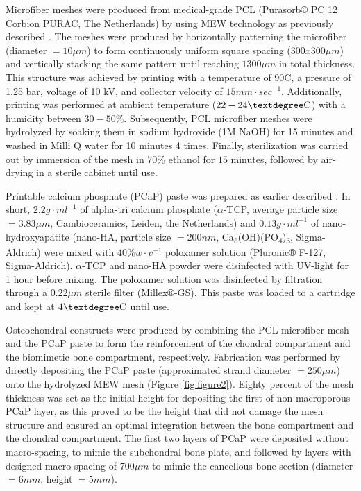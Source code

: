 \documentclass[twocolumn, empirical, authordate, issue]{jote-new-article}
\begin{document}
Microfiber meshes were produced from medical-grade PCL (Purasorb® PC 12 Corbion PURAC, The Netherlands) by using MEW technology as previously described \parencite{deRuijter2019}. The meshes were produced by horizontally patterning the microfiber (diameter $= 10 \mu m$) to form continuously uniform square spacing ($300x300 \mu m$) and vertically stacking the same pattern until reaching $1300 \mu m$ in total thickness. This structure was achieved by printing with a temperature of 90\textdegree C, a pressure of 1.25 bar, voltage of 10 kV, and collector velocity of $ 15 mm\cdot sec^{-1} $. Additionally, printing was performed at ambient temperature ($22 - 24 \textdegree \text{C}$) with a humidity between $30 - 50\%$. Subsequently, PCL microfiber meshes were hydrolyzed by soaking them in sodium hydroxide (1M NaOH) for 15 minutes and washed in Milli Q water for 10 minutes 4 times. Finally, sterilization was carried out by immersion of the mesh in $70\%$ ethanol for $15$ minutes, followed by air-drying in a sterile cabinet until use.

Printable calcium phosphate (PCaP) paste was prepared as earlier described \parencite{Diloksumpan2020}. In short, $2.2 g\cdot ml^{-1}$ of alpha-tri calcium phosphate ($\alpha$-TCP, average particle size $= 3.83 \mu m$, Cambioceramics, Leiden, the Netherlands) and $0.13 g\cdot ml^{-1}$ of nano-hydroxyapatite (nano-HA, particle size $=200 nm$, Ca\textsubscript{5}(OH)(PO\textsubscript{4})\textsubscript{3}, Sigma-Aldrich) were mixed with $40\% w\cdot v^{-1}$ poloxamer solution (Pluronic® F-127, Sigma-Aldrich). $\alpha$-TCP and nano-HA powder were disinfected with UV-light for 1 hour before mixing. The poloxamer solution was disinfected by filtration through a $0.22 \mu m$ sterile filter (Millex®-GS). This paste was loaded to a cartridge and kept at $4\textdegree \text{C}$ until use.

Osteochondral constructs were produced by combining the PCL microfiber mesh and the PCaP paste to form the reinforcement of the chondral compartment and the biomimetic bone compartment, respectively. Fabrication was performed by directly depositing the PCaP paste (approximated strand diameter $= 250 \mu m$) onto the hydrolyzed MEW mesh (Figure \ref{fig:figure2}). Eighty percent of the mesh thickness was set as the initial height for depositing the first of non-macroporous PCaP layer, as this proved to be the height that did not damage the mesh structure and ensured an optimal integration between the bone compartment and the chondral compartment. The first two layers of PCaP were deposited without macro-spacing, to mimic the subchondral bone plate, and followed by layers with designed macro-spacing of $700 \mu m$ to mimic the cancellous bone section (diameter $= 6 mm$, height $= 5 mm$).
\end{document}
